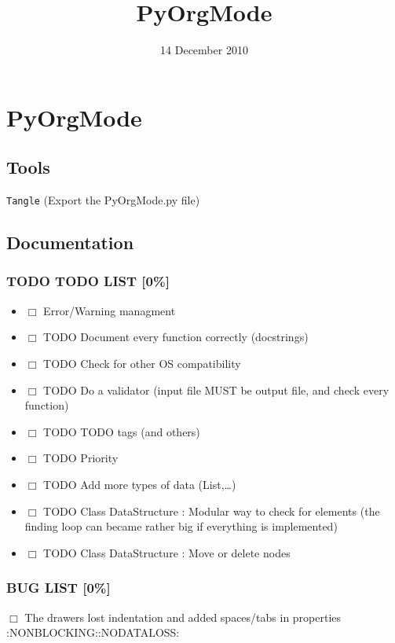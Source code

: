 \documentclass[11pt]{article}
\title{PyOrgMode}
\author{}
\date{14 December 2010}
\begin{document}
\maketitle

\setcounter{tocdepth}{3}
\tableofcontents
\vspace*{1cm}
\section{PyOrgMode}
\label{sec-1}
\subsection{Tools}
\label{sec-1_1}

\texttt{Tangle} (Export the PyOrgMode.py file)
\subsection{Documentation}
\label{sec-1_2}
\subsubsection{\textbf{TODO} TODO LIST [0\%]}
\label{sec-1_2_1}

\begin{itemize}
\item $\Box$ Error/Warning managment
\item $\Box$ TODO Document every function correctly (docstrings)
\item $\Box$ TODO Check for other OS compatibility
\item $\Box$ TODO Do a validator (input file MUST be output file, and check every function)
\item $\Box$ TODO TODO tags (and others)
\item $\Box$ TODO Priority
\item $\Box$ TODO Add more types of data (List,…)
\item $\Box$ TODO Class DataStructure : Modular way to check for elements (the finding loop can became rather big if everything is implemented)
\item $\Box$ TODO Class DataStructure : Move or delete nodes
\end{itemize}
\subsubsection{BUG LIST [0\%]}
\label{sec-1_2_2}

\begin{description}
\item $\Box$ The drawers lost indentation and added spaces/tabs in properties  :NONBLOCKING::NODATALOSS:
\end{description}
\end{document}
